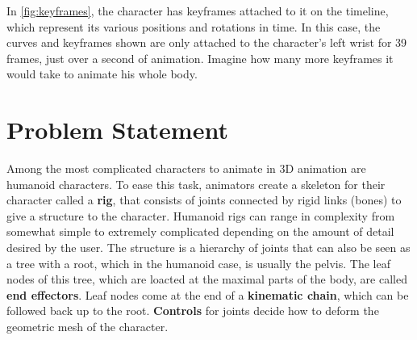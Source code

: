 In \autoref{fig:keyframes}, the character has keyframes attached to it on the timeline, which represent its various positions and rotations in time. In this case, the curves and keyframes shown are only attached to the character's left wrist for 39 frames, just over a second of animation. Imagine how many more keyframes it would take to animate his whole body.

\section{Problem Statement}

Among the most complicated characters to animate in 3D animation are humanoid characters. To ease this task, animators create a skeleton for their character called a \textbf{rig}, that consists of joints connected by rigid links (bones) to give a structure to the character. Humanoid rigs can range in complexity from somewhat simple to extremely complicated depending on the amount of detail desired by the user. The structure is a hierarchy of joints that can also be seen as a tree with a root, which in the humanoid case, is usually the pelvis. The leaf nodes of this tree, which are loacted at the maximal parts of the body, are called  \textbf{end effectors}. Leaf nodes come at the end of a \textbf{kinematic chain}, which can be followed back up to the root. \textbf{Controls} for joints decide how to deform the geometric mesh of the character.

